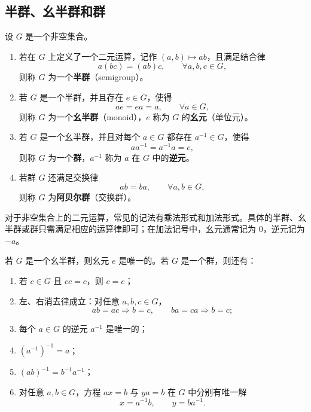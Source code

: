 \subsection{半群、幺半群和群}

\begin{definition}[半群、幺半群与群]\label{def:semigroup-monoid-group}
设 $G$ 是一个非空集合。
\begin{enumerate}[label=(\arabic*)]
  \item 若在 $G$ 上定义了一个二元运算，记作 $(a,b)\mapsto ab$，且满足结合律
  \[
    a(bc)=(ab)c,\qquad \forall a,b,c\in G,
  \]
  则称 $G$ 为一个\textbf{半群}（semigroup）。

  \item 若 $G$ 是一个半群，并且存在 $e\in G$，使得
  \[
    ae=ea=a,\qquad \forall a\in G,
  \]
  则称 $G$ 为一个\textbf{幺半群}（monoid），$e$ 称为 $G$ 的\textbf{幺元}（单位元）。

  \item 若 $G$ 是一个幺半群，并且对每个 $a\in G$ 都存在 $a^{-1}\in G$，使得
  \[
    aa^{-1}=a^{-1}a=e,
  \]
  则称 $G$ 为一个\textbf{群}，$a^{-1}$ 称为 $a$ 在 $G$ 中的\textbf{逆元}。

  \item 若群 $G$ 还满足交换律
  \[
    ab=ba,\qquad \forall a,b\in G,
  \]
  则称 $G$ 为\textbf{阿贝尔群}（交换群）。
\end{enumerate}
\end{definition}

\begin{purplenote}
对于非空集合上的二元运算，常见的记法有乘法形式和加法形式。具体的半群、幺半群或群只需满足相应的运算律即可；在加法记号中，幺元通常记为 $0$，逆元记为 $-a$。
\end{purplenote}

\begin{theorem}\label{thm:basic-group-properties}
若 $G$ 是一个幺半群，则幺元 $e$ 是唯一的。若 $G$ 是一个群，则还有：
\begin{enumerate}[label=(\arabic*)]
  \item 若 $c\in G$ 且 $cc=c$，则 $c=e$；
  \item 左、右消去律成立：对任意 $a,b,c\in G$，
  \[
    ab=ac\Longrightarrow b=c,
    \qquad
    ba=ca\Longrightarrow b=c;
  \]
  \item 每个 $a\in G$ 的逆元 $a^{-1}$ 是唯一的；
  \item $(a^{-1})^{-1}=a$；
  \item $(ab)^{-1}=b^{-1}a^{-1}$；
  \item 对任意 $a,b\in G$，方程 $ax=b$ 与 $ya=b$ 在 $G$ 中分别有唯一解
  \[
    x=a^{-1}b,\qquad y=ba^{-1}.
  \]
\end{enumerate}
\end{theorem}

